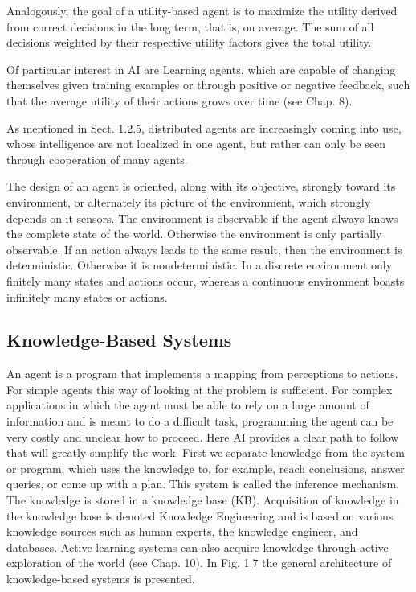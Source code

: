 \documentclass[10pt]{book}
\begin{document}
Analogously, the goal of a utility-based agent is to maximize the utility derived from correct decisions in the long term, that is, on average. The sum of all decisions weighted by their respective utility factors gives the total utility.

Of particular interest in AI are Learning agents, which are capable of changing themselves given training examples or through positive or negative feedback, such that the average utility of their actions grows over time (see Chap. 8).

As mentioned in Sect. 1.2.5, distributed agents are increasingly coming into use, whose intelligence are not localized in one agent, but rather can only be seen through cooperation of many agents.

The design of an agent is oriented, along with its objective, strongly toward its environment, or alternately its picture of the environment, which strongly depends on it sensors. The environment is observable if the agent always knows the complete state of the world. Otherwise the environment is only partially observable. If an action always leads to the same result, then the environment is deterministic. Otherwise it is nondeterministic. In a discrete environment only finitely many states and actions occur, whereas a continuous environment boasts infinitely many states or actions.

\subsection{Knowledge-Based Systems}
An agent is a program that implements a mapping from perceptions to actions. For simple agents this way of looking at the problem is sufficient. For complex applications in which the agent must be able to rely on a large amount of information and is meant to do a difficult task, programming the agent can be very costly and unclear how to proceed. Here AI provides a clear path to follow that will greatly simplify the work.
First we separate knowledge from the system or program, which uses the knowledge to, for example, reach conclusions, answer queries, or come up with a plan. This system is called the inference mechanism. The knowledge is stored in a knowledge base (KB). Acquisition of knowledge in the knowledge base is denoted Knowledge Engineering and is based on various knowledge sources such as human experts, the knowledge engineer, and databases. Active learning systems can also acquire knowledge through active exploration of the world (see Chap. 10). In Fig. 1.7 the general architecture of knowledge-based systems is presented.
\end{document}
